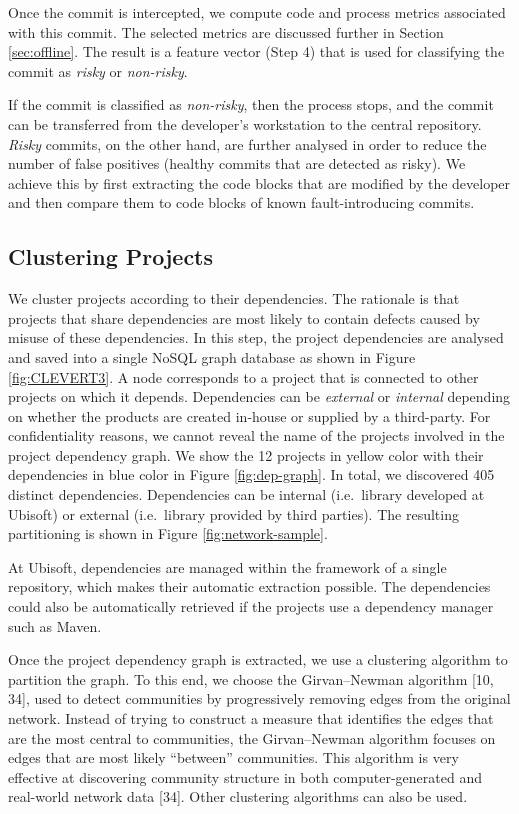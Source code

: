 \documentclass[sigconf]{acmart}
\begin{document}
Once the commit is intercepted, we compute code and process metrics
associated with this commit. The selected metrics are discussed further
in Section \ref{sec:offline}. The result is a feature vector (Step 4)
that is used for classifying the commit as \emph{risky} or
\emph{non-risky}.

If the commit is classified as \emph{non-risky}, then the process stops,
and the commit can be transferred from the developer's workstation to
the central repository. \emph{Risky} commits, on the other hand, are
further analysed in order to reduce the number of false positives
(healthy commits that are detected as risky). We achieve this by first
extracting the code blocks that are modified by the developer and then
compare them to code blocks of known fault-introducing commits.

\subsection{Clustering Projects}\label{sec:clustering}

We cluster projects according to their dependencies. The rationale is
that projects that share dependencies are most likely to contain defects
caused by misuse of these dependencies. In this step, the project
dependencies are analysed and saved into a single NoSQL graph database
as shown in Figure \ref{fig:CLEVERT3}. A node corresponds to a project
that is connected to other projects on which it depends. Dependencies
can be \emph{external} or \emph{internal} depending on whether the
products are created in-house or supplied by a third-party. For
confidentiality reasons, we cannot reveal the name of the projects
involved in the project dependency graph. We show the 12 projects in
yellow color with their dependencies in blue color in Figure
\ref{fig:dep-graph}. In total, we discovered 405 distinct dependencies.
Dependencies can be internal (i.e.~library developed at Ubisoft) or
external (i.e.~library provided by third parties). The resulting
partitioning is shown in Figure \ref{fig:network-sample}.



At Ubisoft, dependencies are managed within the framework of a single
repository, which makes their automatic extraction possible. The
dependencies could also be automatically retrieved if the projects use a
dependency manager such as Maven.



Once the project dependency graph is extracted, we use a clustering
algorithm to partition the graph. To this end, we choose the
Girvan--Newman algorithm [10, 34], used to detect communities by
progressively removing edges from the original network. Instead of
trying to construct a measure that identifies the edges that are the
most central to communities, the Girvan--Newman algorithm focuses on
edges that are most likely ``between'' communities. This algorithm is
very effective at discovering community structure in both
computer-generated and real-world network data [34]. Other
clustering algorithms can also be used.
\end{document}

